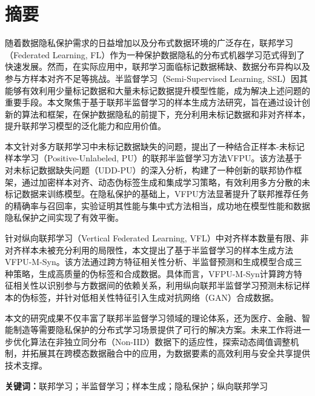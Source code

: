 


\chapter{摘\quad 要}
\xiaosi

随着数据隐私保护需求的日益增加以及分布式数据环境的广泛存在，联邦学习（Federated Learning, FL）作为一种保护数据隐私的分布式机器学习范式得到了快速发展。然而，在实际应用中，联邦学习面临标记数据稀缺、数据分布异构以及参与方样本对齐不足等挑战。半监督学习（Semi-Supervised Learning, SSL）因其能够有效利用少量标记数据和大量未标记数据提升模型性能，成为解决上述问题的重要手段。本文聚焦于基于联邦半监督学习的样本生成方法研究，旨在通过设计创新的算法和框架，在保护数据隐私的前提下，充分利用未标记数据和非对齐样本，提升联邦学习模型的泛化能力和应用价值。  

本文针对多方联邦学习中未标记数据缺失的问题，提出了一种结合正样本-未标记样本学习（Positive-Unlabeled, PU）的联邦半监督学习方法VFPU。该方法基于对未标记数据缺失问题（UDD-PU）的深入分析，构建了一种创新的联邦协作框架，通过加密样本对齐、动态伪标签生成和集成学习策略，有效利用多方分散的未标记数据来训练模型。在隐私保护的基础上，VFPU方法显著提升了联邦推荐任务的精确率与召回率，实验证明其性能与集中式方法相当，成功地在模型性能和数据隐私保护之间实现了有效平衡。 

针对纵向联邦学习（Vertical Federated Learning, VFL）中对齐样本数量有限、非对齐样本未被充分利用的局限性，本文提出了基于半监督学习的样本生成方法VFPU-M-Syn。该方法通过跨方特征相关性分析、半监督预测和生成模型合成三种策略，生成高质量的伪标签和合成数据。具体而言，VFPU-M-Syn计算跨方特征相关性以识别参与方数据间的依赖关系，利用纵向联邦半监督学习预测未标记样本的伪标签，并针对低相关性特征引入生成对抗网络（GAN）合成数据。 

本文的研究成果不仅丰富了联邦半监督学习领域的理论体系，还为医疗、金融、智能制造等需要隐私保护的分布式学习场景提供了可行的解决方案。未来工作将进一步优化算法在非独立同分布（Non-IID）数据下的适应性，探索动态阈值调整机制，并拓展其在跨模态数据融合中的应用，为数据要素的高效利用与安全共享提供技术支撑。
  
\noindent\songti\textbf{关键词：}联邦学习；半监督学习；样本生成；隐私保护；纵向联邦学习

\clearpage